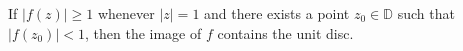 If $|f(z)| \ge 1$ whenever $|z| = 1$ and there exists a point $z_0 \in \mathbb{D}$ such that $|f(z_0)| < 1$, 
then the image of $f$ contains the unit disc.

\begin{solution}
    \ \\
\end{solution}